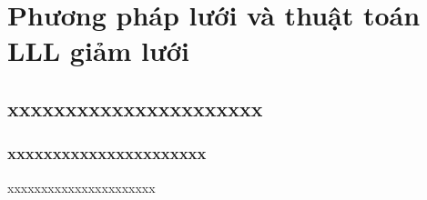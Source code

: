 \documentclass{beamer}
\begin{document}

\section{Phương pháp lưới và thuật toán LLL giảm lưới}
\subsection{xxxxxxxxxxxxxxxxxxxxxx}
\subsubsection{xxxxxxxxxxxxxxxxxxxxxx}
\begin{frame}{xxxxxxxxxxxxxxxxxxxxxx}

\end{frame}
\end{document}
